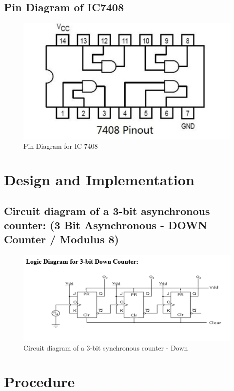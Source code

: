 \documentclass[11pt]{article}
\begin{document}
\subsection{Pin Diagram of IC7408}
\begin{figure}[H]
	\centering
	\includegraphics[scale = 0.25]{7408.jpg}
	\caption{Pin Diagram for IC 7408}
\end{figure}

\section{Design and Implementation}

\subsection{Circuit diagram of a 3-bit asynchronous counter: (3 Bit Asynchronous - DOWN Counter / Modulus 8)}

\begin{figure}[H]
	\centering
	\includegraphics[scale = 1.4]{bit synch down counter.png}
	\caption{Circuit diagram of a 3-bit synchronous counter - Down}
\end{figure}


\section{Procedure}
\end{document}
